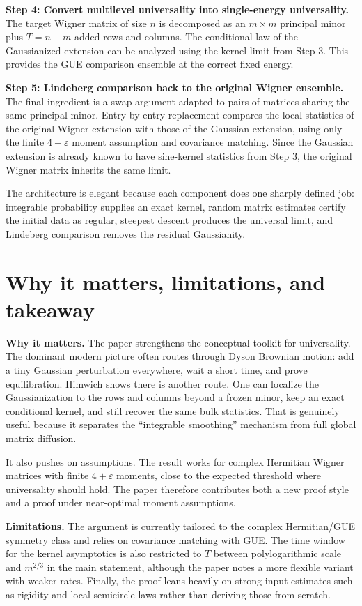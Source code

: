 \documentclass[11pt]{article}
\begin{document}
\textbf{Step 4: Convert multilevel universality into single-energy universality.}
The target Wigner matrix of size $n$ is decomposed as an $m\times m$ principal minor plus $T=n-m$ added rows and columns. The conditional law of the Gaussianized extension can be analyzed using the kernel limit from Step 3. This provides the GUE comparison ensemble at the correct fixed energy.

\textbf{Step 5: Lindeberg comparison back to the original Wigner ensemble.}
The final ingredient is a swap argument adapted to pairs of matrices sharing the same principal minor. Entry-by-entry replacement compares the local statistics of the original Wigner extension with those of the Gaussian extension, using only the finite $4+\varepsilon$ moment assumption and covariance matching. Since the Gaussian extension is already known to have sine-kernel statistics from Step 3, the original Wigner matrix inherits the same limit.

The architecture is elegant because each component does one sharply defined job: integrable probability supplies an exact kernel, random matrix estimates certify the initial data as regular, steepest descent produces the universal limit, and Lindeberg comparison removes the residual Gaussianity.

\section*{Why it matters, limitations, and takeaway}
\textbf{Why it matters.} The paper strengthens the conceptual toolkit for universality. The dominant modern picture often routes through Dyson Brownian motion: add a tiny Gaussian perturbation everywhere, wait a short time, and prove equilibration. Himwich shows there is another route. One can localize the Gaussianization to the rows and columns beyond a frozen minor, keep an exact conditional kernel, and still recover the same bulk statistics. That is genuinely useful because it separates the ``integrable smoothing'' mechanism from full global matrix diffusion.

It also pushes on assumptions. The result works for complex Hermitian Wigner matrices with finite $4+\varepsilon$ moments, close to the expected threshold where universality should hold. The paper therefore contributes both a new proof style and a proof under near-optimal moment assumptions.

\textbf{Limitations.} The argument is currently tailored to the complex Hermitian/GUE symmetry class and relies on covariance matching with GUE. The time window for the kernel asymptotics is also restricted to $T$ between polylogarithmic scale and $m^{2/3}$ in the main statement, although the paper notes a more flexible variant with weaker rates. Finally, the proof leans heavily on strong input estimates such as rigidity and local semicircle laws rather than deriving those from scratch.
\end{document}
